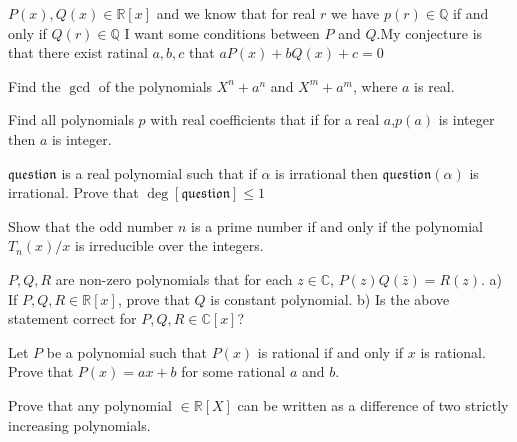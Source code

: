 \documentclass[12pt,a4paper]{memoir}
\theoremstyle{definition}
\begin{document}
\begin{question}
	$P(x),Q(x) \in \mathbb{R}[x]$ and we know that for real $r$ we have $p(r) \in \mathbb{Q}$ if and only if $Q(r) \in \mathbb{Q}$
	I want some conditions between $P$ and $Q$.My conjecture is that there exist ratinal $a,b,c$ that $aP(x)+bQ(x)+c=0$
\end{question}


\begin{question}
	Find the $\gcd$ of the polynomials $X^n+a^n$ and $X^m+a^m$, where $a$ is real.
\end{question}


\begin{question}
	Find all polynomials $p$ with real coefficients that if for a real $a$,$p(a)$ is integer then $a$ is integer.
\end{question}



\begin{question}
	$\mathfrak {question}$ is a real polynomial such that if $\alpha$ is irrational then $\mathfrak {question} (\alpha)$ is irrational. Prove that $\deg [\mathfrak{question}]\leq 1$
\end{question}



\begin{question}
	Show that the odd number $n$ is a prime number if and only if the polynomial $ T_n(x)/x$ is irreducible over the integers.
\end{question}



\begin{question}
	$P,Q,R$ are non-zero polynomials that for each $z\in\mathbb C$, $P(z)Q(\bar z)=R(z)$.
	a) If $P,Q,R\in\mathbb R[x]$, prove that $Q$ is constant polynomial.
	b) Is the above statement correct for $P,Q,R\in\mathbb C[x]$?
\end{question}



\begin{question}
	Let $P$ be a polynomial such that $P(x)$ is rational if and only if $x$ is rational. Prove that $P(x)=ax+b$ for some rational $a$ and $b$.
\end{question}



\begin{question}
	Prove that any polynomial $\in \mathbb{R} [X]$ can be written as a difference of two strictly increasing polynomials.
\end{question}
\end{document}
